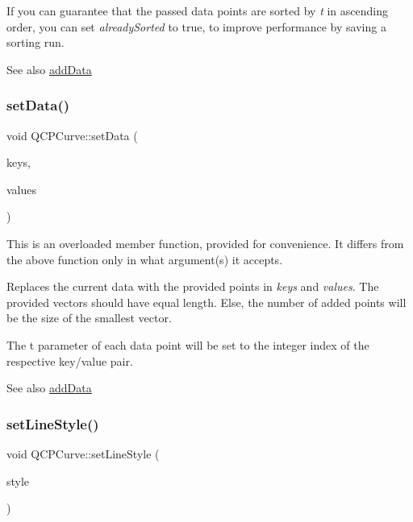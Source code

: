 If you can guarantee that the passed data points are sorted by {\itshape t} in ascending order, you can set {\itshape already\+Sorted} to true, to improve performance by saving a sorting run.

\begin{DoxySeeAlso}{See also}
\hyperlink{classQCPCurve_a73edf394b94f3f24f07518e30565a07f}{add\+Data} 
\end{DoxySeeAlso}
\mbox{\label{classQCPCurve_a9d3245d43304226e013240c94802f7f6}} 
\subsubsection{\texorpdfstring{set\+Data()}{setData()}\hspace{0.1cm}{\footnotesize\ttfamily [3/3]}}
{\footnotesize\ttfamily void Q\+C\+P\+Curve\+::set\+Data (\begin{DoxyParamCaption}\item[{const Q\+Vector$<$ double $>$ \&}]{keys,  }\item[{const Q\+Vector$<$ double $>$ \&}]{values }\end{DoxyParamCaption})}

This is an overloaded member function, provided for convenience. It differs from the above function only in what argument(s) it accepts.

Replaces the current data with the provided points in {\itshape keys} and {\itshape values}. The provided vectors should have equal length. Else, the number of added points will be the size of the smallest vector.

The t parameter of each data point will be set to the integer index of the respective key/value pair.

\begin{DoxySeeAlso}{See also}
\hyperlink{classQCPCurve_a73edf394b94f3f24f07518e30565a07f}{add\+Data} 
\end{DoxySeeAlso}
\mbox{\label{classQCPCurve_a4a377ec863ff81a1875c3094a6177c19}} 
\subsubsection{\texorpdfstring{set\+Line\+Style()}{setLineStyle()}}
{\footnotesize\ttfamily void Q\+C\+P\+Curve\+::set\+Line\+Style (\begin{DoxyParamCaption}\item[{\hyperlink{classQCPCurve_a2710e9f79302152cff794c6e16cc01f1}{Q\+C\+P\+Curve\+::\+Line\+Style}}]{style }\end{DoxyParamCaption})}

